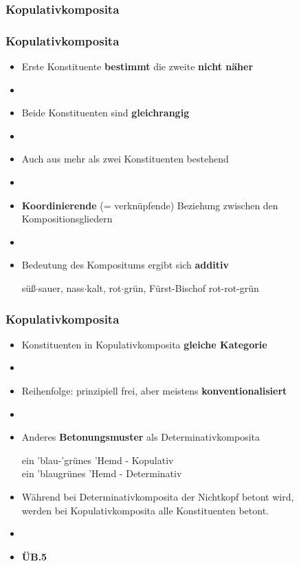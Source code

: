 \subsubsection{Kopulativkomposita}


\begin{frame}
\frametitle{Kopulativkomposita}

\begin{itemize}
	\item Erste Konstituente \textbf{bestimmt} die zweite \textbf{nicht näher}
	\item[]
	\item Beide Konstituenten sind \textbf{gleichrangig}
	\item[]
	\item Auch aus mehr als zwei Konstituenten bestehend
	\item[]
	\item \textbf{Koordinierende} (= verknüpfende) Beziehung zwischen den Kompositionsgliedern
	\item[]
	\item Bedeutung des Kompositums ergibt sich \textbf{additiv}
	
	\eal 
	\ex süß$\cdot$sauer, nass$\cdot$kalt, rot$\cdot$grün, Fürst-Bischof
	\ex rot-rot-grün
	\zl
	
\end{itemize}


\end{frame}


\begin{frame}
\frametitle{Kopulativkomposita}

\begin{itemize}
	\item Konstituenten in Kopulativkomposita \ras \textbf{gleiche Kategorie}
	\item[]
	\item Reihenfolge: prinzipiell frei, aber meistens \textbf{konventionalisiert}
	\item[]
	\item Anderes \textbf{Betonungsmuster} als Determinativkomposita
	
	\ea ein 'blau-'grünes 'Hemd - Kopulativ \\
		 ein 'blaugrünes 'Hemd - Determinativ
	\z
		 
	\item Während bei Determinativkomposita der Nichtkopf betont wird,\\
              werden bei Kopulativkomposita alle Konstituenten betont.
	\item[]
	\item[] \textbf{ÜB.5}
\end{itemize}


\end{frame}


